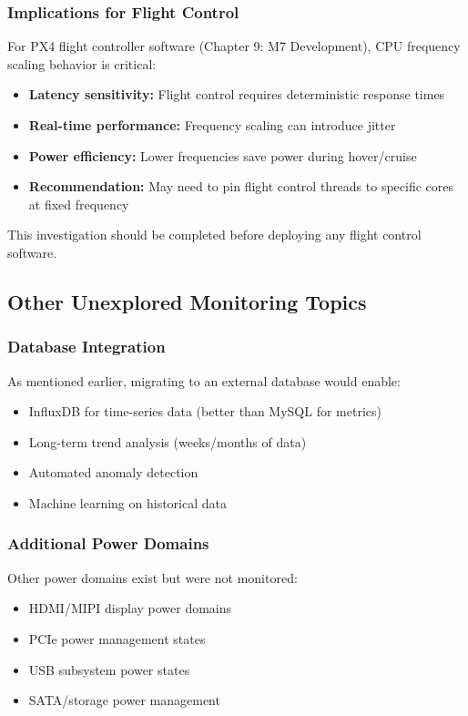 \documentclass[12pt,a4paper]{report}
\begin{document}
\subsubsection{Implications for Flight Control}

For PX4 flight controller software (Chapter 9: M7 Development), CPU frequency scaling behavior is critical:

\begin{itemize}
    \item \textbf{Latency sensitivity:} Flight control requires deterministic response times
    \item \textbf{Real-time performance:} Frequency scaling can introduce jitter
    \item \textbf{Power efficiency:} Lower frequencies save power during hover/cruise
    \item \textbf{Recommendation:} May need to pin flight control threads to specific cores at fixed frequency
\end{itemize}

This investigation should be completed before deploying any flight control software.

\subsection{Other Unexplored Monitoring Topics}

\subsubsection{Database Integration}

As mentioned earlier, migrating to an external database would enable:
\begin{itemize}
    \item InfluxDB for time-series data (better than MySQL for metrics)
    \item Long-term trend analysis (weeks/months of data)
    \item Automated anomaly detection
    \item Machine learning on historical data
\end{itemize}

\subsubsection{Additional Power Domains}

Other power domains exist but were not monitored:
\begin{itemize}
    \item HDMI/MIPI display power domains
    \item PCIe power management states
    \item USB subsystem power states
    \item SATA/storage power management
\end{itemize}
\end{document}
